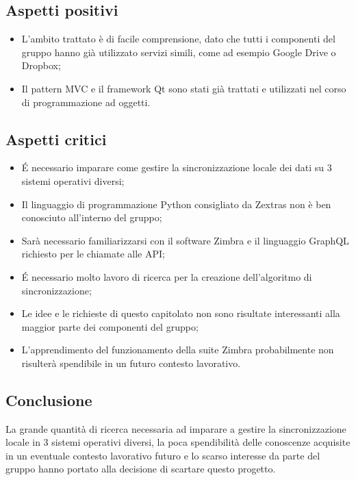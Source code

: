 \subsection{Aspetti positivi}
\begin{itemize}
\item L'ambito trattato è di facile comprensione, dato che tutti i componenti del gruppo hanno già utilizzato servizi simili, come ad esempio Google Drive o Dropbox;
\item Il pattern MVC e il framework Qt sono stati già trattati e utilizzati nel corso di programmazione ad oggetti.
\end{itemize}

\subsection{Aspetti critici}
\begin{itemize}
\item É necessario imparare come gestire la sincronizzazione locale dei dati su 3 sistemi operativi diversi;
\item Il linguaggio di programmazione Python consigliato da Zextras non è ben conosciuto all'interno del gruppo;
\item Sarà necessario familiarizzarsi con il software Zimbra e il linguaggio GraphQL richiesto per le chiamate alle API;
\item É necessario molto lavoro di ricerca per la creazione dell'algoritmo di sincronizzazione;
\item Le idee e le richieste di questo capitolato non sono risultate interessanti alla maggior parte dei componenti del gruppo;
\item L'apprendimento del funzionamento della suite Zimbra probabilmente non risulterà spendibile in un futuro contesto lavorativo.
\end{itemize}

\subsection{Conclusione}
La grande quantità di ricerca necessaria ad imparare a gestire la sincronizzazione locale in 3 sistemi operativi diversi, la poca spendibilità delle conoscenze acquisite in un eventuale contesto lavorativo futuro e lo scarso interesse da parte del gruppo hanno portato alla decisione di scartare questo progetto.
